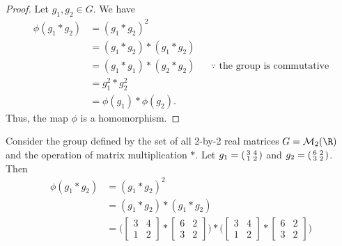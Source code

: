 \documentclass[
  coursecode={MTHE 418},
  assignmentname={Homework \homeworknumber},
  studentnumber=20053722,
  name={Bryan Hoang},
  draft,
]{
  ltxanswer%
}
\begin{document}
\begin{questions}
\begin{parts}
      \part{}
      \begin{solution}
        \begin{proof}
          Let \(g_{1}, g_{2} \in G\). We have
          \begin{align*}
            \phi(g_{1} * g_{2}) &= (g_{1} * g_{2})^{2}                                                            \\
                                &= (g_{1} * g_{2}) * (g_{1} * g_{2})                                              \\
                                &= (g_{1} * g_{1}) * (g_{2} * g_{2}) & &\because \text{ the group is commutative} \\
                                &= g_{1}^{2} * g_{2}^{2}                                                          \\
                                &= \phi(g_{1}) * \phi(g_{2}).
          \end{align*}
          Thus, the map \(\phi\) is a homomorphism.
        \end{proof}
        \begin{example}
          Consider the group defined by the set of all 2-by-2 real matrices \(G = \mathcal{M}_{2}(\R)\) and the operation of matrix multiplication \(*\). Let \(g_{1} = \begin{psmallmatrix}3 & 4\\1 & 2\end{psmallmatrix}\) and \(g_{2} = \begin{psmallmatrix}6 & 2\\3 & 2\end{psmallmatrix}\). Then
          \begin{align*}
            \phi(g_{1} * g_{2}) &= (g_{1} * g_{2})^{2}                                                                                                                                                                                   \\
                                &= (g_{1} * g_{2}) * (g_{1} * g_{2})                                                                                                                                                                     \\
                                &= \Biggl(\begin{bmatrix}3 & 4\\1 & 2\end{bmatrix} * \begin{bmatrix}6 & 2\\3 & 2\end{bmatrix}\Biggr) * \Biggl(\begin{bmatrix}3 & 4\\1 & 2\end{bmatrix} * \begin{bmatrix}6 & 2\\3 & 2\end{bmatrix}\Biggr) \\

\end{align*}
\end{example}
\end{solution}
\end{parts}
\end{questions}
\end{document}
